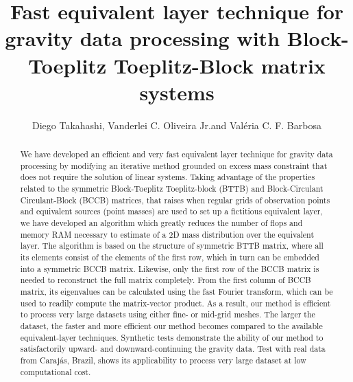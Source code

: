 \documentclass[paper]{geophysics}
\begin{document}
\title{Fast equivalent layer technique for gravity data processing with Block-Toeplitz Toeplitz-Block matrix systems}

\renewcommand{\thefootnote}{\fnsymbol{footnote}} 


\address{
\footnotemark[1]Observat\'orio Nacional, \\
77 General Jos\'e Cristino Av., \\
Rio de Janeiro, RJ, 20921400 \\
}
\author{Diego Takahashi\footnotemark[1], Vanderlei C. Oliveira Jr.\footnotemark[1] and Val\'eria
	C. F. Barbosa\footnotemark[1]}


\maketitle

\begin{abstract}
We have developed an efficient and very fast equivalent layer technique for gravity data processing by modifying an iterative method grounded on excess mass constraint that does not require the solution of linear systems. Taking advantage of the properties related to the symmetric Block-Toeplitz Toeplitz-block (BTTB) and Block-Circulant Circulant-Block (BCCB) matrices, that raises when regular grids of observation points and equivalent sources (point masses) are used to set up a fictitious equivalent layer, we have developed an algorithm which greatly 
reduces the number of flops and memory RAM necessary to estimate of a 2D mass distribution over the equivalent layer. The algorithm is based on the structure of symmetric BTTB matrix, where all its elements consist of the elements of the first row, which in turn can be embedded into a symmetric BCCB matrix. Likewise, only the first row of the BCCB matrix is needed to reconstruct the full matrix completely. From the first column of BCCB matrix, its eigenvalues can be calculated using the fast Fourier transform, which can be used to readily compute the matrix-vector product. As a result, our method is efficient to process very large datasets using either fine- or mid-grid meshes. The larger the dataset, the faster and more efficient our method becomes compared to the available equivalent-layer techniques. Synthetic tests demonstrate the ability of our method to satisfactorily upward- and downward-continuing the gravity data. Test with real data from Caraj\'as, Brazil, shows its applicability to process very large dataset at low computational cost.
\end{abstract}
\end{document}
